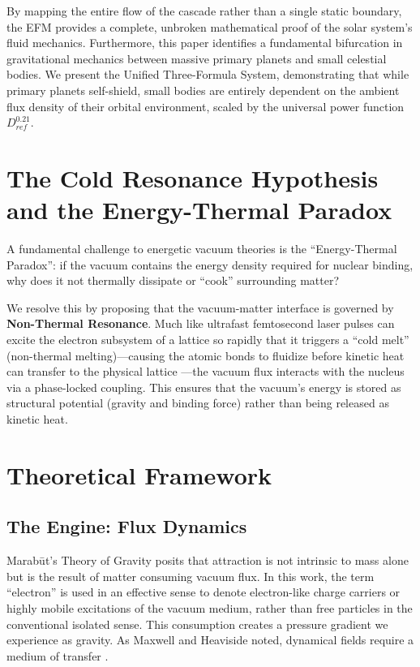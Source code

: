 \documentclass[11pt, a4paper]{article}
\begin{document}
  By mapping the entire flow of the cascade rather than a single static boundary, the EFM provides a complete, unbroken mathematical proof of the solar system's fluid mechanics. Furthermore, this paper identifies a fundamental bifurcation in gravitational mechanics between massive primary planets and small celestial bodies. We present the Unified Three-Formula System, demonstrating that while primary planets self-shield, small bodies are entirely dependent on the ambient flux density of their orbital environment, scaled by the universal power function $D_{ref}^{0.21}$.

\section{The Cold Resonance Hypothesis and the Energy-Thermal Paradox}
  A fundamental challenge to energetic vacuum theories is the ``Energy-Thermal Paradox'': if the vacuum contains the energy density required for nuclear binding, why does it not thermally dissipate or ``cook'' surrounding matter? 
  
  We resolve this by proposing that the vacuum-matter interface is governed by \textbf{Non-Thermal Resonance}. Much like ultrafast femtosecond laser pulses can excite the electron subsystem of a lattice so rapidly that it triggers a ``cold melt'' (non-thermal melting)—causing the atomic bonds to fluidize before kinetic heat can transfer to the physical lattice \cite{rousse2001}—the vacuum flux interacts with the nucleus via a phase-locked coupling. This ensures that the vacuum's energy is stored as structural potential (gravity and binding force) rather than being released as kinetic heat.

\section{Theoretical Framework}

\subsection{The Engine: Flux Dynamics}
Marab\={u}t's Theory of Gravity posits that attraction is not intrinsic to mass alone but is the result of matter consuming vacuum flux. In this work, the term ``electron'' is used in an effective sense to denote electron-like charge carriers or highly mobile excitations of the vacuum medium, rather than free particles in the conventional isolated sense. This consumption creates a pressure gradient we experience as gravity. As Maxwell and Heaviside noted, dynamical fields require a medium of transfer \cite{maxwell1865, heaviside1893}.
\end{document}
